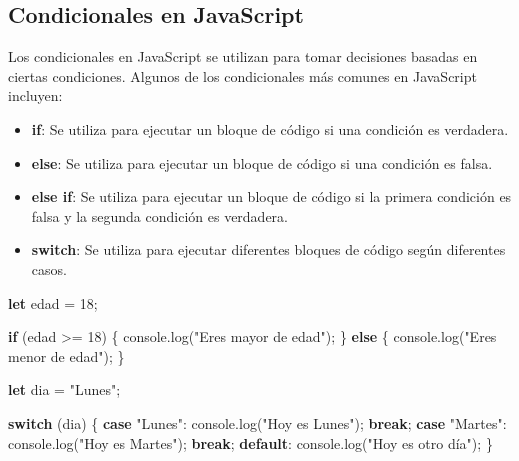 \documentclass[
  a4paper,
  DIV=11,
  numbers=noendperiod,
  onepage,
  openany]{scrreprt}
\newenvironment{Shaded}{\begin{snugshade}}{\end{snugshade}}
\newcommand{\BuiltInTok}[1]{\textcolor[rgb]{0.00,0.23,0.31}{#1}}
\newcommand{\ControlFlowTok}[1]{\textcolor[rgb]{0.00,0.23,0.31}{\textbf{#1}}}
\newcommand{\DecValTok}[1]{\textcolor[rgb]{0.68,0.00,0.00}{#1}}
\newcommand{\FunctionTok}[1]{\textcolor[rgb]{0.28,0.35,0.67}{#1}}
\newcommand{\KeywordTok}[1]{\textcolor[rgb]{0.00,0.23,0.31}{\textbf{#1}}}
\newcommand{\NormalTok}[1]{\textcolor[rgb]{0.00,0.23,0.31}{#1}}
\newcommand{\OperatorTok}[1]{\textcolor[rgb]{0.37,0.37,0.37}{#1}}
\newcommand{\StringTok}[1]{\textcolor[rgb]{0.13,0.47,0.30}{#1}}
\providecommand{\tightlist}{%
  \setlength{\itemsep}{0pt}\setlength{\parskip}{0pt}}\usepackage{longtable,booktabs,array}
\begin{document}
\begin{tcolorbox}
\section{Condicionales en JavaScript}\label{condicionales-en-javascript}

Los condicionales en JavaScript se utilizan para tomar decisiones
basadas en ciertas condiciones. Algunos de los condicionales más comunes
en JavaScript incluyen:

\begin{itemize}
\tightlist
\item
  \textbf{if}: Se utiliza para ejecutar un bloque de código si una
  condición es verdadera.
\item
  \textbf{else}: Se utiliza para ejecutar un bloque de código si una
  condición es falsa.
\item
  \textbf{else if}: Se utiliza para ejecutar un bloque de código si la
  primera condición es falsa y la segunda condición es verdadera.
\item
  \textbf{switch}: Se utiliza para ejecutar diferentes bloques de código
  según diferentes casos.
\end{itemize}

\begin{Shaded}
\begin{Highlighting}[]
\KeywordTok{let}\NormalTok{ edad }\OperatorTok{=} \DecValTok{18}\OperatorTok{;}

\ControlFlowTok{if}\NormalTok{ (edad }\OperatorTok{\textgreater{}=} \DecValTok{18}\NormalTok{) \{}
    \BuiltInTok{console}\OperatorTok{.}\FunctionTok{log}\NormalTok{(}\StringTok{"Eres mayor de edad"}\NormalTok{)}\OperatorTok{;}
\NormalTok{\} }\ControlFlowTok{else}\NormalTok{ \{}
    \BuiltInTok{console}\OperatorTok{.}\FunctionTok{log}\NormalTok{(}\StringTok{"Eres menor de edad"}\NormalTok{)}\OperatorTok{;}
\NormalTok{\}}

\KeywordTok{let}\NormalTok{ dia }\OperatorTok{=} \StringTok{"Lunes"}\OperatorTok{;}

\ControlFlowTok{switch}\NormalTok{ (dia) \{}
    \ControlFlowTok{case} \StringTok{"Lunes"}\OperatorTok{:}
        \BuiltInTok{console}\OperatorTok{.}\FunctionTok{log}\NormalTok{(}\StringTok{"Hoy es Lunes"}\NormalTok{)}\OperatorTok{;}
        \ControlFlowTok{break}\OperatorTok{;}
    \ControlFlowTok{case} \StringTok{"Martes"}\OperatorTok{:}
        \BuiltInTok{console}\OperatorTok{.}\FunctionTok{log}\NormalTok{(}\StringTok{"Hoy es Martes"}\NormalTok{)}\OperatorTok{;}
        \ControlFlowTok{break}\OperatorTok{;}
    \ControlFlowTok{default}\OperatorTok{:}
        \BuiltInTok{console}\OperatorTok{.}\FunctionTok{log}\NormalTok{(}\StringTok{"Hoy es otro día"}\NormalTok{)}\OperatorTok{;}
\NormalTok{\}}
\end{Highlighting}
\end{Shaded}


\end{tcolorbox}
\end{document}
